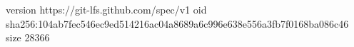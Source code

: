 version https://git-lfs.github.com/spec/v1
oid sha256:104ab7fec546ec9ed514216ac04a8689a6c996e638e556a3fb7f0168ba086c46
size 28366
